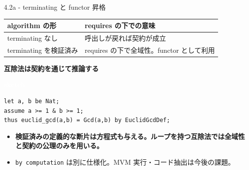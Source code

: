 \documentclass[dvipdfmx,aspectratio=169,11pt]{beamer}
\newcommand{\statusbadge}[2]{\colorbox{#1}{\textcolor{white}{\strut\scriptsize\sffamily\bfseries #2}}}
\newcommand{\badgeSketch}{\statusbadge{orange!75!black}{sketch}}
\begin{document}
\begin{frame}[fragile,t]{4.2a - terminating と functor 昇格}
\begin{footnotesize}
\setlength{\tabcolsep}{3pt}
\renewcommand{\arraystretch}{1.15}
\begin{tabularx}{\textwidth}{>{\raggedright\arraybackslash}X>{\raggedright\arraybackslash}X}
\toprule
\textbf{algorithm の形} & \textbf{requires の下での意味} \\
\midrule
terminating なし & 呼出しが戻れば契約が成立 \\
terminating を検証済み & requires の下で全域性。functor として利用 \\
\bottomrule
\end{tabularx}
\end{footnotesize}

\smallskip
\textbf{互除法は契約を通じて推論する}~\badgeSketch
\begin{lstlisting}[language={mizar},basicstyle=\ttfamily\small]
let a, b be Nat;
assume a >= 1 & b >= 1;
thus euclid_gcd(a,b) = Gcd(a,b) by EuclidGcdDef;
\end{lstlisting}
\begin{itemize}
\setlength{\itemsep}{1pt}
\setlength{\parsep}{0pt}
\setlength{\parskip}{0pt}
\item \textcolor{blue!55!black}{\textbf{検証済みの定義的な断片は方程式も与える。ループを持つ互除法では全域性と契約の公理のみを用いる。}}
\item \texttt{by computation} は別に仕様化。MVM 実行・コード抽出は今後の課題。
\end{itemize}
\end{frame}
\end{document}
